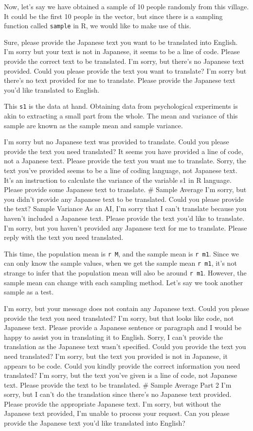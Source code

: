 \documentclass[
  a4paper,
]{book}
\begin{document}
Now, let's say we have obtained a sample of 10 people randomly from this
village. It could be the first 10 people in the vector, but since there
is a sampling function called \texttt{sample} in R, we would like to
make use of this.

Sure, please provide the Japanese text you want to be translated into
English. I'm sorry but your text is not in Japanese, it seems to be a
line of code. Please provide the correct text to be translated. I'm
sorry, but there's no Japanese text provided. Could you please provide
the text you want to translate? I'm sorry but there's no text provided
for me to translate. Please provide the Japanese text you'd like
translated to English.

This \texttt{s1} is the data at hand. Obtaining data from psychological
experiments is akin to extracting a small part from the whole. The mean
and variance of this sample are known as the sample mean and sample
variance.

I'm sorry but no Japanese text was provided to translate. Could you
please provide the text you need translated? It seems you have provided
a line of code, not a Japanese text. Please provide the text you want me
to translate. Sorry, the text you've provided seems to be a line of
coding language, not Japanese text. It's an instruction to calculate the
variance of the variable s1 in R language. Please provide some Japanese
text to translate. \# Sample Average I'm sorry, but you didn't provide
any Japanese text to be translated. Could you please provide the text?
Sample Variance As an AI, I'm sorry that I can't translate because you
haven't included a Japanese text. Please provide the text you'd like to
translate. I'm sorry, but you haven't provided any Japanese text for me
to translate. Please reply with the text you need translated.

This time, the population mean is \texttt{r\ M}, and the sample mean is
\texttt{r\ m1}. Since we can only know the sample values, when we get
the sample mean \texttt{r\ m1}, it's not strange to infer that the
population mean will also be around \texttt{r\ m1}. However, the sample
mean can change with each sampling method. Let's say we took another
sample as a test.

I'm sorry, but your message does not contain any Japanese text. Could
you please provide the text you need translated? I'm sorry, but that
looks like code, not Japanese text. Please provide a Japanese sentence
or paragraph and I would be happy to assist you in translating it to
English. Sorry, I can't provide the translation as the Japanese text
wasn't specified. Could you provide the text you need translated? I'm
sorry, but the text you provided is not in Japanese, it appears to be
code. Could you kindly provide the correct information you need
translated? I'm sorry, but the text you've given is a line of code, not
Japanese text. Please provide the text to be translated. \# Sample
Average Part 2 I'm sorry, but I can't do the translation since there's
no Japanese text provided. Please provide the appropriate Japanese text.
I'm sorry, but without the Japanese text provided, I'm unable to process
your request. Can you please provide the Japanese text you'd like
translated into English?
\end{document}
